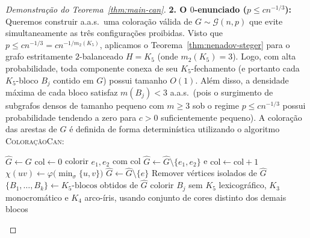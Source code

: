 \documentclass[reqno, 12pt]{amsart}
\numberwithin{equation}{section}
\theoremstyle{plain}
\theoremstyle{definition}
\newcommand{\Gnp}{\mathcal{G}(n,p)}
\newcommand{\mdens}{m_2}
\newcommand{\maxdens}{m}
\newcommand{\whp}{a.a.s.}
\begin{document}
\begin{proof}[Demonstração do Teorema~\ref{thm:main-can}]
    \medskip
    \noindent\textbf{2. O $0$-enunciado ($p \le c n^{-1/3}$):}
    Queremos construir \whp\ uma coloração válida de $G \sim \Gnp$ que evite simultaneamente as três configurações proibidas.
    Visto que $p \le c n^{-1/3} = c n^{-1/\mdens(K_5)}$, aplicamos o Teorema~\ref{thm:nenadov-steger} para o grafo estritamente $2$-balanceado $H = K_5$ (onde $\mdens(K_5) = 3$). Logo, com alta probabilidade, toda componente conexa de seu $K_5$-fechamento (e portanto cada $K_5$-bloco $B_j$ contido em $G$) possui tamanho $O(1)$.
    Além disso, a densidade máxima de cada bloco satisfaz $\maxdens(B_j) < 3$ \whp\ (pois o surgimento de subgrafos densos de tamanho pequeno com $\maxdens \ge 3$ sob o regime $p \le c n^{-1/3}$ possui probabilidade tendendo a zero para $c > 0$ suficientemente pequeno).
    A coloração das arestas de $G$ é definida de forma determinística utilizando o algoritmo \textsc{ColoraçãoCan}:

    \begin{algorithm}[H]
        \caption{\textsc{ColoraçãoCan}$(G = (V, E),\; \sigma)$}
        \label{alg:coloracao-can}
        \begin{algorithmic}[1]
            \State $\hat{G} \leftarrow G$
            \State $\mathrm{col} \leftarrow 0$
            \State colorir $e_1, e_2$ com col
            \State $\hat{G} \leftarrow \hat{G} \setminus \{e_1, e_2\}$ e $\mathrm{col} \leftarrow \mathrm{col} + 1$
            \EndWhile
            \State $\chi(uv) \leftarrow \varphi\!\bigl(\min_\sigma\{u,v\}\bigr)$
            \EndFor
            \State $\hat{G} \leftarrow \hat{G} \setminus \{e\}$
            \EndWhile
            \State Remover vértices isolados de $\hat{G}$
            \State $\{B_1, \ldots, B_k\} \leftarrow K_5\text{-blocos}$ obtidos de $\hat{G}$
            \State colorir $B_j$ sem $K_5$ lexicográfico, $K_3$ monocromático e $K_4$ arco-íris,
            \Statex \hspace{2.85em} usando conjunto de cores distinto dos demais blocos
            \EndFor
        \end{algorithmic}
    \end{algorithm}


\end{proof}
\end{document}
